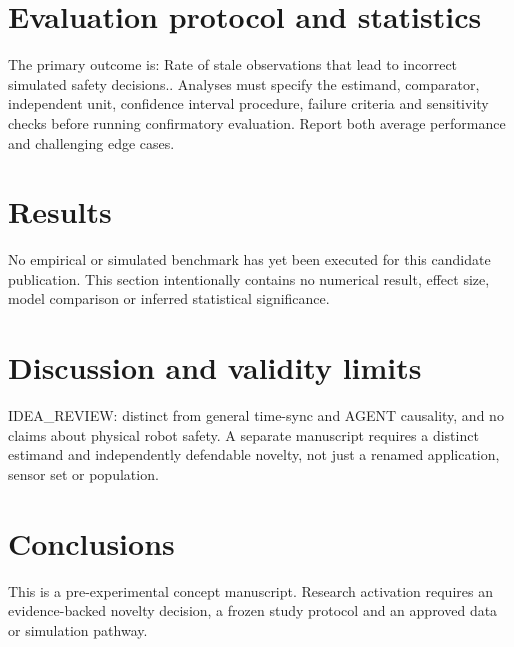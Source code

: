 \documentclass[11pt,a4paper]{article}
\begin{document}
\section{Evaluation protocol and statistics}
The primary outcome is: Rate of stale observations that lead to incorrect simulated safety decisions.. Analyses must specify the estimand, comparator, independent unit, confidence interval procedure, failure criteria and sensitivity checks before running confirmatory evaluation. Report both average performance and challenging edge cases.
\section{Results}
No empirical or simulated benchmark has yet been executed for this candidate publication. This section intentionally contains no numerical result, effect size, model comparison or inferred statistical significance.
\section{Discussion and validity limits}
IDEA\_REVIEW: distinct from general time-sync and AGENT causality, and no claims about physical robot safety. A separate manuscript requires a distinct estimand and independently defendable novelty, not just a renamed application, sensor set or population.
\section{Conclusions}
This is a pre-experimental concept manuscript. Research activation requires an evidence-backed novelty decision, a frozen study protocol and an approved data or simulation pathway.
\end{document}
